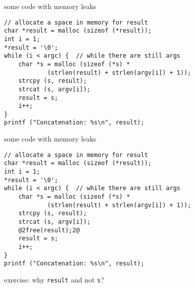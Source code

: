 \begin{frame}[fragile,label=memLeakCode]{some code with memory leaks}
\lstset{language=C++,style=smaller}
\begin{lstlisting}
// allocate a space in memory for result
char *result = malloc (sizeof (*result));
int i = 1;
*result = '\0';
while (i < argc) {  // while there are still args
    char *s = malloc (sizeof (*s) *
            (strlen(result) + strlen(argv[i]) + 1));
    strcpy (s, result);
    strcat (s, argv[i]);
    result = s;
    i++;
}
printf ("Concatenation: %s\n", result);
\end{lstlisting}
\end{frame}


\begin{frame}[fragile,label=memLeakCodeFixed]{some code with memory leaks}
\begin{lstlisting}
// allocate a space in memory for result
char *result = malloc (sizeof (*result));
int i = 1;
*result = '\0';
while (i < argc) {  // while there are still args
    char *s = malloc (sizeof (*s) *
            (strlen(result) + strlen(argv[i]) + 1));
    strcpy (s, result);
    strcat (s, argv[i]);
    @2free(result);2@
    result = s;
    i++;
}
printf ("Concatenation: %s\n", result);
\end{lstlisting}
exercise: why \texttt{result} and not \texttt{s}?
\end{frame}

